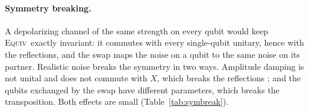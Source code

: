 \documentclass[aps,pra,reprint,superscriptaddress,longbibliography]{revtex4-2}
\newcommand{\Equiv}{\textsc{Equiv}}
\begin{document}
\paragraph{Symmetry breaking.} A depolarizing channel of the same strength on every qubit would keep \Equiv\ exactly invariant: it commutes with every single-qubit unitary, hence with the reflections, and the swap maps the noise on a qubit to the same noise on its partner. Realistic noise breaks the symmetry in two ways. Amplitude damping is not unital and does not commute with $X$, which breaks the reflections \citep{tuysuz2024symmetry}; and the qubits exchanged by the swap have different parameters, which breaks the transposition. Both effects are small (Table~\ref{tab:symbreak}).



\end{document}
